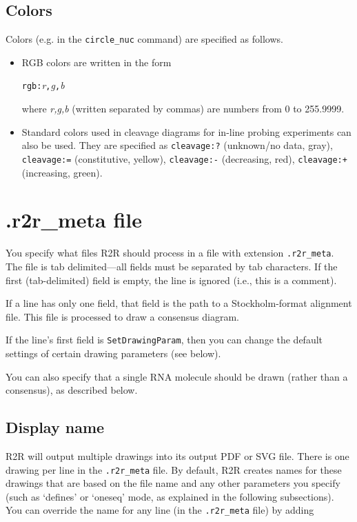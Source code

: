 \documentclass[letterpaper,12pt]{report}
\begin{document}
\subsection{Colors}
\label{color}

Colors (e.g. in the {\tt circle\_nuc} command) are specified as follows.  

\begin{itemize}
\item RGB colors are written in the form

{\tt rgb:}\textit{r}{\tt ,}\textit{g}{\tt ,}\textit{b}

where \textit{r,g,b }(written separated by commas) are numbers from 0 to
255.9999.
\item Standard colors used in cleavage diagrams for in-line probing experiments can also be used.  They are specified
as 
{\tt cleavage:?} (unknown/no data, gray), {\tt cleavage:=} (constitutive, yellow), {\tt cleavage:-} (decreasing, red), {\tt cleavage:+} (increasing, green).
\end{itemize}

\section{.r2r\_meta file}
\label{metafile}
You specify what files R2R should process in a file with extension
{\tt .r2r\_meta}.
The file is tab delimited---all fields must be separated by tab characters.  If the first (tab-delimited) field is empty,
the line is ignored (i.e., this is a comment).

If a line has only one field, that field is the path to a Stockholm-format
alignment file.  This file is processed to draw a consensus diagram.

If the line{\textquoteright}s first field is {\tt SetDrawingParam}, then you
can change the default settings of certain drawing parameters (see below).

You can also specify that a single RNA molecule should be drawn (rather than a consensus),
as described below.

\subsection{Display name}
\label{sec:displayName}

R2R will output multiple drawings into its output PDF or SVG file.  There is one drawing per line in the {\tt .r2r\_meta} file.  By default, R2R creates names for these drawings that are based on the file name and any other parameters you specify (such as `defines' or `oneseq' mode, as explained in the following subsections).  You can override the name for any line (in the {\tt .r2r\_meta} file) by adding
\end{document}
